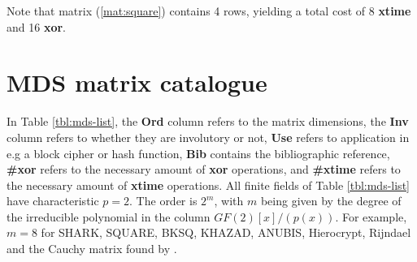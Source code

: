 \documentclass{report}
\begin{document}
Note that matrix (\ref{mat:square}) contains 4 rows, yielding a total cost of 8 \textbf{xtime} and 16 \textbf{xor}.

\section{MDS matrix catalogue}

In Table \ref{tbl:mds-list}, the \textbf{Ord} column refers to the matrix dimensions, the \textbf{Inv} column refers to whether they are involutory or not, \textbf{Use} refers to application in e.g a block cipher or hash function, \textbf{Bib} contains the bibliographic reference, \textbf{\#xor} refers to the necessary amount of \textbf{xor} operations, and \textbf{\#xtime} refers to the necessary amount of \textbf{xtime} operations. All finite fields of Table \ref{tbl:mds-list} have characteristic $p = 2$. The order is $2^m$, with $m$ being given by the degree of the irreducible polynomial in the column $GF(2)[x]/(p(x))$. For example, $m = 8$ for SHARK, SQUARE, BKSQ, KHAZAD, ANUBIS, Hierocrypt, Rijndael and the Cauchy matrix found by \cite{Youssef1997}.
\end{document}
